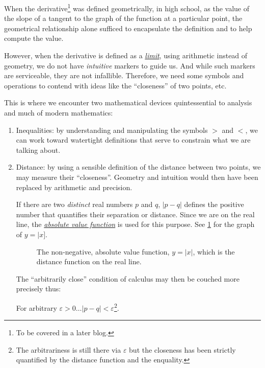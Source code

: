 \documentclass[
  a4paper,
]{article}
\begin{document}
When the derivative\footnote{To be covered in a later blog.} was defined
geometrically, in high school, as the value of the slope of a tangent to
the graph of the function at a particular point, the geometrical
relationship alone sufficed to encapsulate the definition and to help
compute the value.

However, when the derivative is defined as a
\href{https://en.wikipedia.org/wiki/Limit_(mathematics)}{\emph{limit}},
using arithmetic instead of geometry, we do not have \emph{intuitive}
markers to guide us. And while such markers are serviceable, they are
not infallible. Therefore, we need some symbols and operations to
contend with ideas like the ``closeness'' of two points, etc.

This is where we encounter two mathematical devices quintessential to
analysis and much of modern mathematics:

\begin{enumerate}
\def\labelenumi{\alph{enumi}.}
\item
  Inequalities: by understanding and manipulating the symbols \(>\) and
  \(<\), we can work toward watertight definitions that serve to
  constrain what we are talking about.
\item
  Distance: by using a sensible definition of the distance between two
  points, we may measure their ``closeness''. Geometry and intuition
  would then have been replaced by arithmetic and precision.

  If there are two \emph{distinct} real numbers \(p\) and \(q\),
  \(|p - q|\) defines the positive number that quantifies their
  separation or distance. Since we are on the real line, the
  \href{https://mathworld.wolfram.com/AbsoluteValue.html}{\emph{absolute
  value function}} is used for this purpose. See \cref{fig:absolute} for
  the graph of \(y = |x]\).

  \begin{figure}
  \centering
  
  \caption{The non-negative, absolute value function, \(y = |x|\), which
  is the distance function on the real line.}\label{fig:absolute}
  \end{figure}

  The ``arbitrarily close'' condition of calculus may then be couched
  more precisely thus:

  For arbitrary
  \(\varepsilon > 0 \dots | p - q | < \varepsilon\)\footnote{The
    arbitrariness is still there via \(\varepsilon\) but the closeness
    has been strictly quantified by the distance function and the
    enquality.}.
\end{enumerate}
\end{document}
